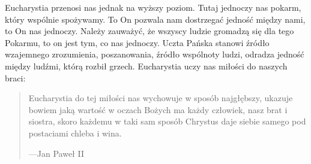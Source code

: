 \documentclass[a5paper,10pt,polish]{book}
\begin{document}
Eucharystia przenosi nas jednak na wyższy poziom. Tutaj jednoczy nas pokarm, który wspólnie spożywamy. To On pozwala nam dostrzegać jedność między nami, to On nas jednoczy. Należy zauważyć, że wszyscy ludzie gromadzą się dla tego Pokarmu, to on jest tym, co nas jednoczy. Uczta Pańska stanowi źródło wzajemnego zrozumienia,
poszanowania, źródło wspólnoty ludzi, odradza jedność między ludźmi, którą rozbił grzech. Eucharystia uczy nas miłości do naszych braci:
\begin{quote}

Eucharystia do tej miłości nas wychowuje w sposób najgłębszy, ukazuje bowiem jaką wartość w oczach Bożych ma każdy człowiek, nasz brat i siostra, skoro każdemu w taki sam sposób Chrystus daje siebie samego pod postaciami chleba i wina.

\begin{flushright}
---Jan Paweł II
\end{flushright}
\end{quote}
\end{document}
